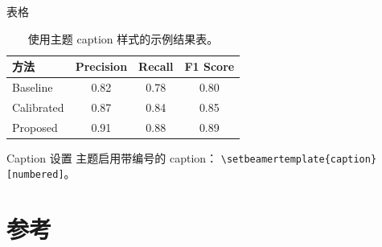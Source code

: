 \documentclass[aspectratio=169,10pt]{ctexbeamer}
\begin{document}
\begin{academicframe}{表格}
  \begin{table}
    \centering
    \caption{使用主题 caption 样式的示例结果表。}
    \begin{tabular}{lccc}
      \toprule
      方法 & Precision & Recall & F1 Score \\
      \midrule
      Baseline & 0.82 & 0.78 & 0.80 \\
      Calibrated & 0.87 & 0.84 & 0.85 \\
      Proposed & 0.91 & 0.88 & 0.89 \\
      \bottomrule
    \end{tabular}
  \end{table}

  \vspace{0.4em}
  \begin{exampleblock}{Caption 设置}
    \small
    主题启用带编号的 caption：
    \texttt{\textbackslash setbeamertemplate\{caption\}[numbered]}。
  \end{exampleblock}
\end{academicframe}

\section{参考}
\end{document}

